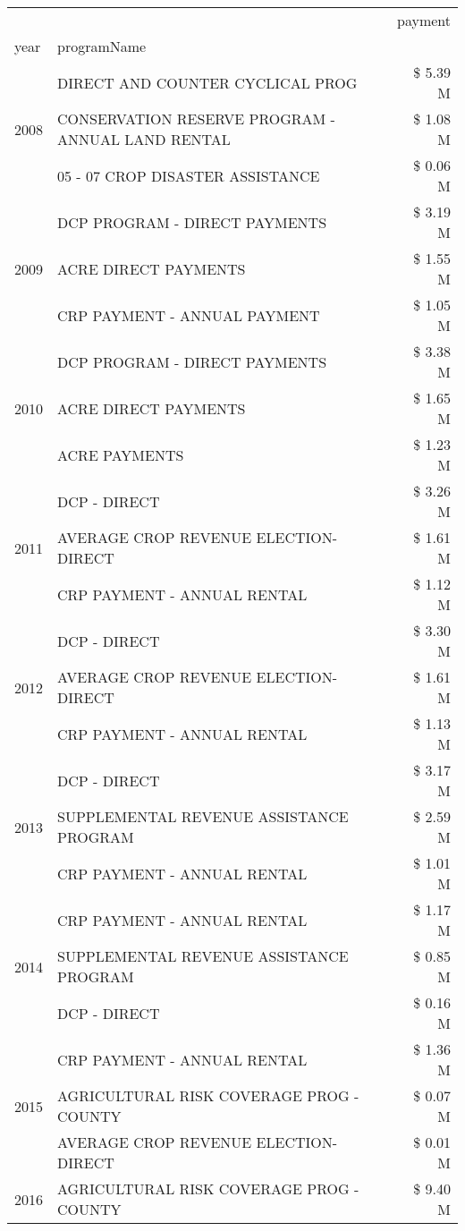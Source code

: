 \begin{tabular}{llr}
\toprule
 &  & payment \\
year & programName &  \\
\midrule
\multirow[t]{3}{*}{2008} & DIRECT AND COUNTER CYCLICAL PROG & \$ 5.39 M \\
 & CONSERVATION RESERVE PROGRAM - ANNUAL LAND RENTAL & \$ 1.08 M \\
 & 05 - 07 CROP DISASTER ASSISTANCE & \$ 0.06 M \\
\cline{1-3}
\multirow[t]{3}{*}{2009} & DCP PROGRAM - DIRECT PAYMENTS & \$ 3.19 M \\
 & ACRE DIRECT PAYMENTS & \$ 1.55 M \\
 & CRP PAYMENT - ANNUAL PAYMENT & \$ 1.05 M \\
\cline{1-3}
\multirow[t]{3}{*}{2010} & DCP PROGRAM - DIRECT PAYMENTS & \$ 3.38 M \\
 & ACRE DIRECT PAYMENTS & \$ 1.65 M \\
 & ACRE PAYMENTS & \$ 1.23 M \\
\cline{1-3}
\multirow[t]{3}{*}{2011} & DCP - DIRECT & \$ 3.26 M \\
 & AVERAGE CROP REVENUE ELECTION-DIRECT & \$ 1.61 M \\
 & CRP PAYMENT - ANNUAL RENTAL & \$ 1.12 M \\
\cline{1-3}
\multirow[t]{3}{*}{2012} & DCP - DIRECT & \$ 3.30 M \\
 & AVERAGE CROP REVENUE ELECTION-DIRECT & \$ 1.61 M \\
 & CRP PAYMENT - ANNUAL RENTAL & \$ 1.13 M \\
\cline{1-3}
\multirow[t]{3}{*}{2013} & DCP - DIRECT & \$ 3.17 M \\
 & SUPPLEMENTAL REVENUE ASSISTANCE PROGRAM & \$ 2.59 M \\
 & CRP PAYMENT - ANNUAL RENTAL & \$ 1.01 M \\
\cline{1-3}
\multirow[t]{3}{*}{2014} & CRP PAYMENT - ANNUAL RENTAL & \$ 1.17 M \\
 & SUPPLEMENTAL REVENUE ASSISTANCE PROGRAM & \$ 0.85 M \\
 & DCP - DIRECT & \$ 0.16 M \\
\cline{1-3}
\multirow[t]{3}{*}{2015} & CRP PAYMENT - ANNUAL RENTAL & \$ 1.36 M \\
 & AGRICULTURAL RISK COVERAGE PROG - COUNTY & \$ 0.07 M \\
 & AVERAGE CROP REVENUE ELECTION-DIRECT & \$ 0.01 M \\
\cline{1-3}
\multirow[t]{3}{*}{2016} & AGRICULTURAL RISK COVERAGE PROG - COUNTY      & \$ 9.40 M \\

\end{tabular}
